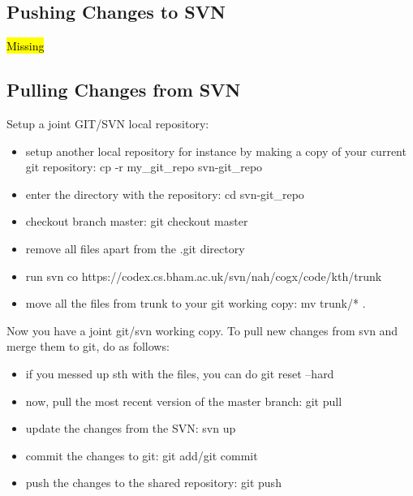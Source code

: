 \documentclass[a4paper,10pt]{article}
\begin{document}
\subsection{Pushing Changes to SVN}
\hl{Missing}


\subsection{Pulling Changes from SVN}
Setup a joint GIT/SVN local repository:
\begin{itemize}
\item setup another local repository for instance by making a copy of your current 
git repository: cp -r my\_git\_repo svn-git\_repo
\item enter the directory with the repository: cd svn-git\_repo
\item checkout branch master: git checkout master
\item remove all files apart from the .git directory
\item run svn co https://codex.cs.bham.ac.uk/svn/nah/cogx/code/kth/trunk
\item move all the files from trunk to your git working copy: mv trunk/* .
\end{itemize}

Now you have a joint git/svn working copy. To pull new changes from svn and 
merge them to git, do as follows:
\begin{itemize}
\item if you messed up sth with the files, you can do git reset --hard
\item now, pull the most recent version of the master branch: git pull
\item update the changes from the SVN: svn up
\item commit the changes to git: git add/git commit
\item push the changes to the shared repository: git push
\end{itemize}




\end{document}
